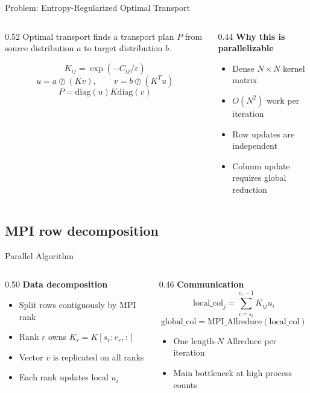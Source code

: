 \documentclass[aspectratio=169,11pt]{beamer}
\begin{document}
\begin{frame}{Problem: Entropy-Regularized Optimal Transport}
\begin{columns}[T]
\begin{column}{0.52\linewidth}
Optimal transport finds a transport plan $P$ from source distribution $a$ to target distribution $b$.

\[
K_{ij} = \exp(-C_{ij}/\varepsilon)
\]
\[
u = a \oslash (Kv), \qquad v = b \oslash (K^Tu)
\]
\[
P = \mathrm{diag}(u)K\mathrm{diag}(v)
\]
\end{column}
\begin{column}{0.44\linewidth}
\textbf{Why this is parallelizable}
\begin{itemize}
  \item Dense $N \times N$ kernel matrix
  \item $O(N^2)$ work per iteration
  \item Row updates are independent
  \item Column update requires global reduction
\end{itemize}
\end{column}
\end{columns}
\end{frame}

\subsection{MPI row decomposition}

\begin{frame}{Parallel Algorithm}
\begin{columns}[T]
\begin{column}{0.50\linewidth}
\textbf{Data decomposition}
\begin{itemize}
  \item Split rows contiguously by MPI rank
  \item Rank $r$ owns $K_r = K[s_r:e_r, :]$
  \item Vector $v$ is replicated on all ranks
  \item Each rank updates local $u_i$
\end{itemize}
\end{column}
\begin{column}{0.46\linewidth}
\textbf{Communication}
\[
\mathrm{local\_col}_j =
\sum_{i=s_r}^{e_r-1} K_{ij}u_i
\]
\[
\mathrm{global\_col} =
\mathrm{MPI\_Allreduce}(\mathrm{local\_col})
\]
\begin{itemize}
  \item One length-$N$ Allreduce per iteration
  \item Main bottleneck at high process counts
\end{itemize}
\end{column}
\end{columns}
\end{frame}
\end{document}
